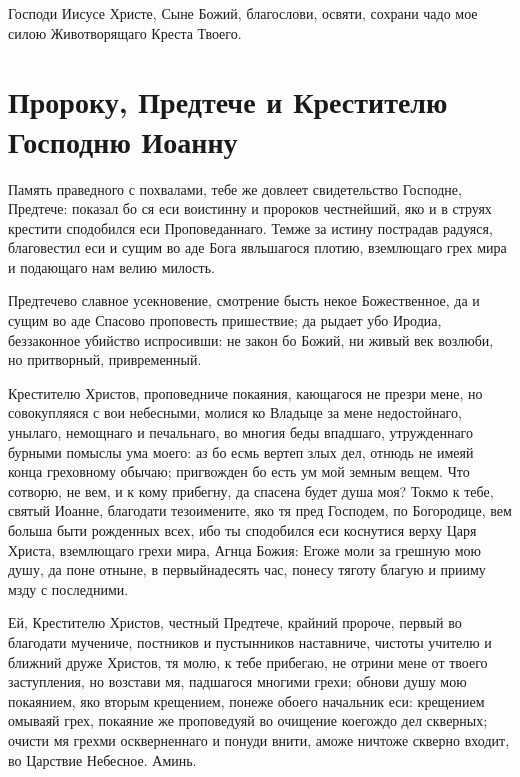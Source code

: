 Господи Иисусе Христе, Сыне Божий, благослови, освяти, сохрани чадо мое силою Животворящаго Креста Твоего.


\section{Пророку, Предтече и Крестителю Господню Иоанну}\begin{mymulticols}



Память праведного с похвалами, тебе же довлеет свидетельство Господне, Предтече: показал бо ся еси воистинну и пророков честнейший, яко и в струях крестити сподобился еси Проповеданнаго. Темже за истину пострадав радуяся, благовестил еси и сущим во аде Бога явльшагося плотию, вземлющаго грех мира и подающаго нам велию милость.




Предтечево славное усекновение, смотрение бысть некое Божественное, да и сущим во аде Спасово проповесть пришествие; да рыдает убо Иродиа, беззаконное убийство испросивши: не закон бо Божий, ни живый век возлюби, но притворный, привременный.




Крестителю Христов, проповедниче покаяния, кающагося не презри мене, но совокупляяся с вои небесными, молися ко Владыце за мене недостойнаго, унылаго, немощнаго и печальнаго, во многия беды впадшаго, утружденнаго бурными помыслы ума моего: аз бо есмь вертеп злых дел, отнюдь не имеяй конца греховному обычаю; пригвожден бо есть ум мой земным вещем. Что сотворю, не вем, и к кому прибегну, да спасена будет душа моя? Токмо к тебе, святый Иоанне, благодати тезоимените, яко тя пред Господем, по Богородице, вем больша быти рожденных всех, ибо ты сподобился еси коснутися верху Царя Христа, вземлющаго грехи мира, Агнца Божия: Егоже моли за грешную мою душу, да поне отныне, в первыйнадесять час, понесу тяготу благую и прииму мзду с последними.

Ей, Крестителю Христов, честный Предтече, крайний пророче, первый во благодати мучениче, постников и пустынников наставниче, чистоты учителю и ближний друже Христов, тя молю, к тебе прибегаю, не отрини мене от твоего заступления, но возстави мя, падшагося многими грехи; обнови душу мою покаянием, яко вторым крещением, понеже обоего начальник еси: крещением омываяй грех, покаяние же проповедуяй во очищение коегождо дел скверных; очисти мя грехми оскверненнаго и понуди внити, аможе ничтоже скверно входит, во Царствие Небесное. Аминь.

\end{mymulticols}

